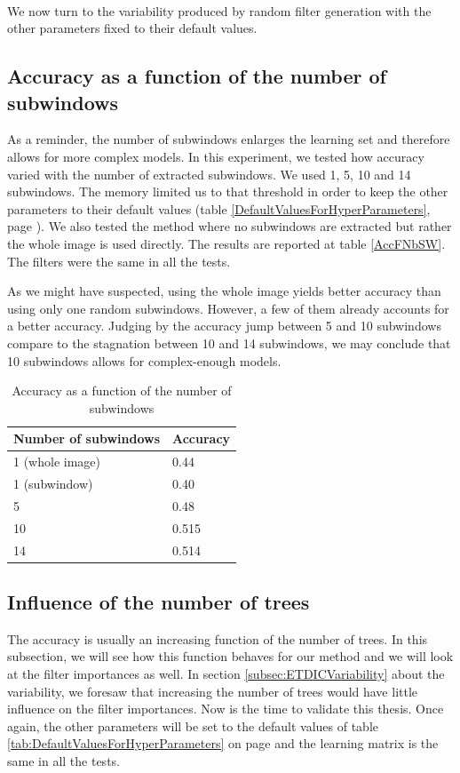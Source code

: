 \documentclass[a4paper]{report}
\newlength{\larg}
\begin{document}
		\paragraph{}
		We now turn to the variability produced by random filter generation with the other parameters fixed to their default values.
		
		
		\subsection{Accuracy as a function of the number of subwindows}
		As a reminder, the number of subwindows enlarges the learning set and therefore allows for more complex models. In this experiment, we tested how accuracy varied with the number of extracted subwindows. We used 1, 5, 10 and 14 subwindows. The memory limited us to that threshold in order to keep the other parameters to their default values (table \ref{DefaultValuesForHyperParameters}, page \pageref{DefaultValuesForHyperParameters}). We also tested the method where no subwindows are extracted but rather the whole image is used directly. The results are reported at table \ref{AccFNbSW}. The filters were the same in all the tests.
		\par
		As we might have suspected, using the whole image yields better accuracy than using only one random subwindows. However, a few of them already accounts for a better accuracy. Judging by the accuracy jump between 5 and 10 subwindows compare to the stagnation between 10 and 14 subwindows, we may conclude that 10 subwindows allows for complex-enough models. 
		
		\begin{table}
			\centering
				\begin{tabular}{l|l}
				\hline
				Number of subwindows & Accuracy \\
				\hline \hline
				1 (whole image) & 0.44\\
				1 (subwindow) & 0.40 \\
				5 & 0.48 \\
				10 & 0.515 \\
				14 &  0.514\\
				\hline
				
				\end{tabular}
			\caption{\label{tab:AccFNbSW}Accuracy as a function of the number of subwindows}
		\end{table}
		
		
		\subsection{Influence of the number of trees}
		The accuracy is usually an increasing function of the number of trees. In this subsection, we will see how this function behaves for our method and we will look at the filter importances as well. In section \ref{subsec:ETDICVariability} about the variability, we foresaw that increasing the number of trees would have little influence on the filter importances. Now is the time to validate this thesis. Once again, the other parameters will be set to the default values of table \ref{tab:DefaultValuesForHyperParameters} on page \pageref{tab:DefaultValuesForHyperParameters} and the learning matrix is the same in all the tests.
\end{document}
